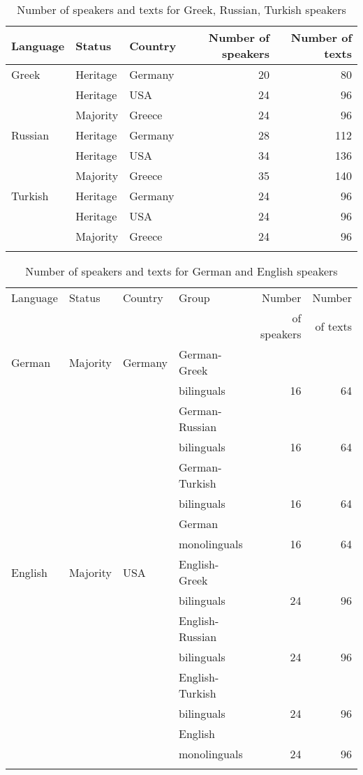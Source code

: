 \documentclass[output=paper,colorlinks,citecolor=brown]{langscibook}
\begin{document}
\begin{table}
\caption{Number of speakers and texts for Greek, Russian, Turkish speakers}
\begin{tabular}{lllrr}
    \lsptoprule
    Language & Status & Country & Number of speakers & Number of texts \\
    \midrule
    Greek & Heritage & Germany & 20 & 80 \\
    ~ & Heritage & USA & 24 & 96 \\
    ~ & Majority & Greece & 24 & 96 \\
    \midrule
    Russian & Heritage & Germany & 28 & 112 \\
    ~ & Heritage & USA & 34 & 136 \\
    ~ & Majority & Greece & 35 & 140 \\
    \midrule
    Turkish & Heritage & Germany & 24 & 96 \\
    ~ & Heritage & USA & 24 & 96 \\
    ~ & Majority & Greece & 24 & 96 \\
    \lspbottomrule
\end{tabular}
\label{table:schroederetal:1}
\end{table}


\begin{table}
\centering
\caption{Number of speakers and texts for German and English speakers}
\begin{tabular}{llllrr}
 \lsptoprule
Language & Status & Country & Group & Number & Number\\
~ & ~ & ~ & ~ & of speakers & of texts\\
  \midrule
 German & Majority & Germany & German-Greek & ~ & ~ \\ 
 ~ & ~ & ~ & bilinguals & 16 & 64 \\
 ~ & ~ & ~ & German-Russian & ~ & ~ \\ 
  ~ & ~ & ~ & bilinguals & 16 & 64 \\
 ~ & ~ & ~ & German-Turkish & ~ & ~ \\ 
  ~ & ~ & ~ & bilinguals & 16 & 64 \\
 ~ & ~ & ~ & German & ~ & ~ \\
   ~ & ~ & ~ & monolinguals & 16 & 64 \\
 \midrule
 English & Majority & USA & English-Greek & ~ & ~ \\ 
   ~ & ~ & ~ & bilinguals & 24 & 96 \\
 ~ & ~ & ~ & English-Russian & ~ & ~ \\ 
  ~ & ~ & ~ & bilinguals & 24 & 96 \\
 ~ & ~ & ~ & English-Turkish & ~ & ~ \\ 
   ~ & ~ & ~ & bilinguals & 24 & 96 \\
 ~ & ~ & ~ & English & ~ & ~  \\ 
   ~ & ~ & ~ & monolinguals & 24 & 96 \\
 \lspbottomrule
\end{tabular}
\label{table:schroederetal:2}
\end{table}
\end{document}
